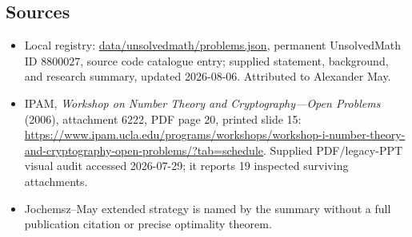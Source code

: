 \documentclass[11pt]{article}
\begin{document}
\subsection{Sources}
\begin{itemize}
\item Local registry: \url{data/unsolvedmath/problems.json}, permanent UnsolvedMath ID \(8800027\), source code catalogue entry; supplied statement, background, and research summary, updated 2026-08-06. Attributed to Alexander May.
\item IPAM, \emph{Workshop on Number Theory and Cryptography---Open Problems} (2006), attachment 6222, PDF page 20, printed slide 15: \url{https://www.ipam.ucla.edu/programs/workshops/workshop-i-number-theory-and-cryptography-open-problems/?tab=schedule}. Supplied PDF/legacy-PPT visual audit accessed 2026-07-29; it reports 19 inspected surviving attachments.
\item Jochemsz--May extended strategy is named by the summary without a full publication citation or precise optimality theorem.
\end{itemize}
\end{document}
